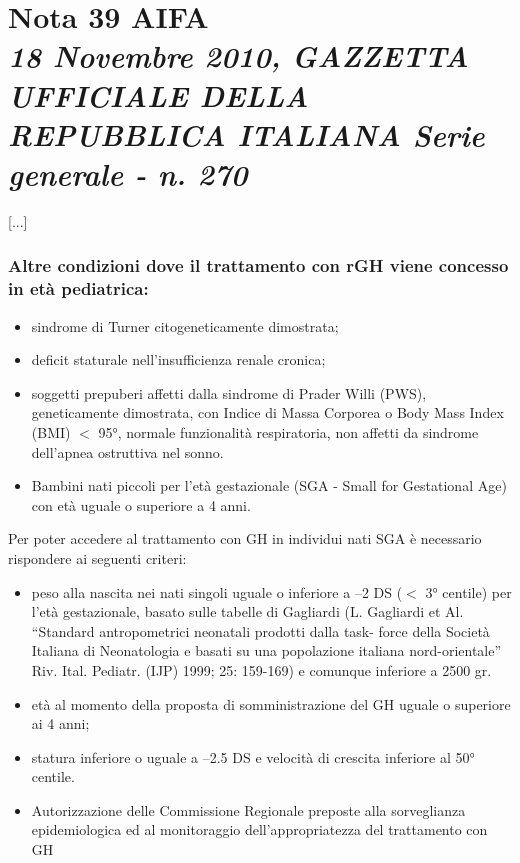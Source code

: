 \setcounter{page}{47}
\chapter[Nota 39 AIFA - 18 Novembre 2010]
	{Nota 39 AIFA\\[.5ex]
	\normalsize\textit{18 Novembre 2010, GAZZETTA UFFICIALE DELLA REPUBBLICA ITALIANA Serie generale - n. 270}}

[...]

\subsection*{Altre condizioni dove il trattamento con rGH viene concesso in et\`a pediatrica:}

\begin{itemize}
\item sindrome di Turner citogeneticamente dimostrata;
\item deficit staturale nell'insufficienza renale cronica;
\item soggetti prepuberi affetti dalla sindrome di Prader Willi (PWS), geneticamente dimostrata, con Indice di Massa Corporea o Body Mass
Index (BMI) $<$ 95°, normale funzionalit\`a respiratoria, non affetti da sindrome dell'apnea ostruttiva nel
sonno.
\item Bambini nati piccoli per l'et\`a gestazionale (SGA - Small for Gestational Age) con et\`a uguale o superiore a
4 anni.
\end{itemize}

Per poter accedere al trattamento con GH in individui nati SGA \`e necessario rispondere ai seguenti criteri:
\begin{itemize}
\item peso alla nascita nei nati singoli uguale o inferiore a –2 DS ($<$ 3° centile) per l'et\`a gestazionale, basato
sulle tabelle di Gagliardi (L. Gagliardi et Al. “Standard antropometrici neonatali prodotti dalla task-
force della Societ\`a Italiana di Neonatologia e basati su una popolazione italiana nord-orientale” Riv.
Ital. Pediatr. (IJP) 1999; 25: 159-169) e comunque inferiore a 2500 gr.
\item et\`a al momento della proposta di somministrazione del GH uguale o superiore ai 4 anni;
\item statura inferiore o uguale a –2.5 DS e velocit\`a di crescita inferiore al 50° centile.
\item Autorizzazione delle Commissione Regionale preposte alla sorveglianza epidemiologica ed al
monitoraggio dell'appropriatezza del trattamento con GH
\end{itemize}


